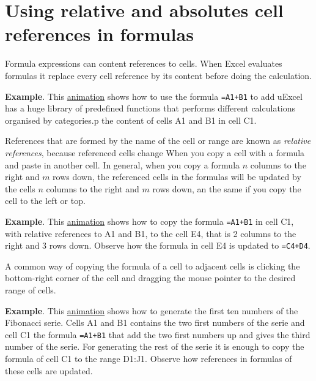 \section{Using relative and absolutes cell references in formulas}\hypertarget{using-relative-and-absolutes-cell-references-in-formulas}{}\label{using-relative-and-absolutes-cell-references-in-formulas}

Formula expressions can content references to cells. When Excel evaluates formulas it replace every cell reference by its content before doing the calculation.

\textbf{Example}. This \href{http://aprendeconalf.es/office/excel/manual/img/example_formulas_with_references.gif}{animation} shows how to use the formula \texttt{=A1+B1} to add uExcel has a huge library of predefined functions that performs different calculations organised by categories.p the content of cells A1 and B1 in cell C1.

References that are formed by the name of the cell or range are known as \emph{relative references}, because referenced cells change When you copy a cell with a formula and paste in another cell. In general, when you copy a formula $n$ columns to the right and $m$ rows down, the referenced cells in the formulas will be updated by the cells $n$ columns to the right and $m$ rows down, an the same if you copy the cell to the left or top.

\textbf{Example}. This \href{http://aprendeconalf.es/office/excel/manual/img/example_copying_formulas_with_relative_references.gif}{animation} shows how to copy the formula \texttt{=A1+B1} in cell C1, with relative references to A1 and B1, to the cell E4, that is 2 columns to the right and 3 rows down. Observe how the formula in cell E4 is updated to \texttt{=C4+D4}.

A common way of copying the formula of a cell to adjacent cells is clicking the bottom-right corner of the cell and dragging the mouse pointer to the desired range of cells.

\textbf{Example}. This \href{http://aprendeconalf.es/office/excel/manual/img/example_fibonacci_serie.gif}{animation} shows how to generate the first ten numbers of the Fibonacci serie. Cells A1 and B1 contains the two first numbers of the serie and cell C1 the formula \texttt{=A1+B1} that add the two first numbers up and gives the third number of the serie. For generating the rest of the serie it is enough to copy the formula of cell C1 to the range D1:J1. Observe how references in formulas of these cells are updated.

